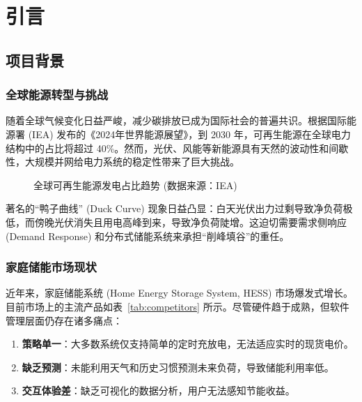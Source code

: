 \chapter{引言}

\section{项目背景}

\subsection{全球能源转型与挑战}
随着全球气候变化日益严峻，减少碳排放已成为国际社会的普遍共识。根据国际能源署 (IEA) 发布的《2024年世界能源展望》，到 2030 年，可再生能源在全球电力结构中的占比将超过 40\%。然而，光伏、风能等新能源具有天然的波动性和间歇性，大规模并网给电力系统的稳定性带来了巨大挑战。

\begin{figure}[htbp]
    \centering
    \caption{全球可再生能源发电占比趋势 (数据来源：IEA)}
    \label{fig:re_trend}
\end{figure}

著名的“鸭子曲线” (Duck Curve) 现象日益凸显：白天光伏出力过剩导致净负荷极低，而傍晚光伏消失且用电高峰到来，导致净负荷陡增。这迫切需要需求侧响应 (Demand Response) 和分布式储能系统来承担“削峰填谷”的重任。

\subsection{家庭储能市场现状}
近年来，家庭储能系统 (Home Energy Storage System, HESS) 市场爆发式增长。目前市场上的主流产品如表~\ref{tab:competitors} 所示。尽管硬件趋于成熟，但软件管理层面仍存在诸多痛点：
\begin{enumerate}
    \item \textbf{策略单一}：大多数系统仅支持简单的定时充放电，无法适应实时的现货电价。
    \item \textbf{缺乏预测}：未能利用天气和历史习惯预测未来负荷，导致储能利用率低。
    \item \textbf{交互体验差}：缺乏可视化的数据分析，用户无法感知节能收益。
\end{enumerate}

